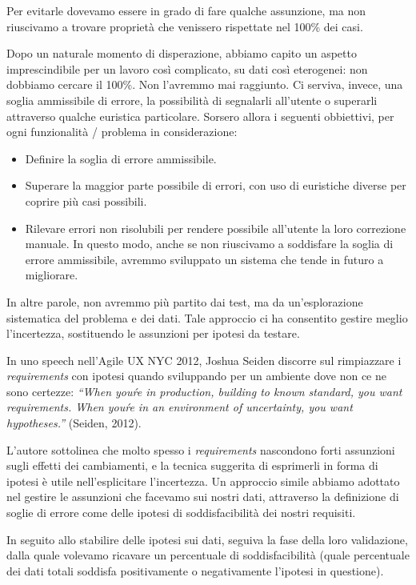 \documentclass[12pt]{report}
\begin{document}
Per evitarle dovevamo essere in grado di fare qualche assunzione, ma non riuscivamo a trovare proprietà che venissero rispettate nel 100\% dei casi. 

Dopo un naturale momento di disperazione, abbiamo capito un aspetto imprescindibile per un lavoro così complicato, su dati così eterogenei: non dobbiamo cercare il 100\%. Non l'avremmo mai raggiunto. Ci serviva, invece, una soglia ammissibile di errore, la possibilità di segnalarli all'utente o superarli attraverso qualche euristica particolare. Sorsero allora i seguenti obbiettivi, per ogni funzionalità / problema in considerazione: 

\begin{itemize}
  \item Definire la soglia di errore ammissibile.
  \item Superare la maggior parte possibile di errori, con uso di euristiche diverse per coprire più casi possibili.
  \item Rilevare errori non risolubili per rendere possibile all'utente la loro correzione manuale. In questo modo, anche se non riuscivamo a soddisfare la soglia di errore ammissibile, avremmo sviluppato un sistema che tende in futuro a migliorare.
\end{itemize}

In altre parole, non avremmo più partito dai test, ma da un'esplorazione sistematica del problema e dei dati. Tale approccio ci ha consentito gestire meglio l'incertezza, sostituendo le assunzioni per ipotesi da testare.

In uno speech nell'Agile UX NYC 2012, Joshua Seiden discorre sul rimpiazzare i \textit{requirements} con ipotesi quando sviluppando per un ambiente dove non ce ne sono certezze: \textit{``When you\'re in production, building to known standard, you want requirements. When you\'re in an environment of uncertainty, you want hypotheses.''} (Seiden, 2012).

L'autore sottolinea che molto spesso i \textit{requirements} nascondono forti assunzioni sugli effetti dei cambiamenti, e la tecnica suggerita di esprimerli in forma di ipotesi è utile nell'esplicitare l'incertezza. Un approccio simile abbiamo adottato nel gestire le assunzioni che facevamo sui nostri dati, attraverso la definizione di soglie di errore come delle ipotesi di soddisfacibilità dei nostri requisiti.

In seguito allo stabilire delle ipotesi sui dati, seguiva la fase della loro validazione, dalla quale volevamo ricavare un percentuale di soddisfacibilità (quale percentuale dei dati totali soddisfa positivamente o negativamente l'ipotesi in questione).
\end{document}
